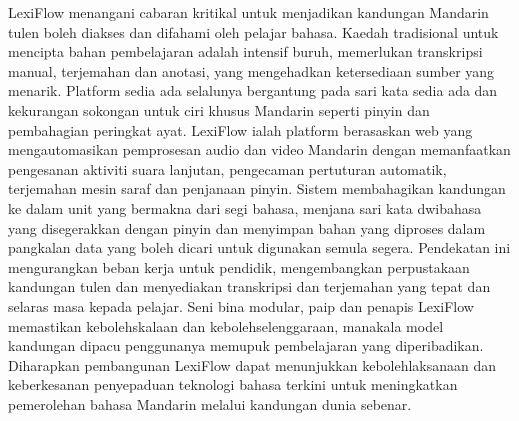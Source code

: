 \documentclass[oneside]{utmthesis}
\begin{document}
\begin{abstract}
    LexiFlow addresses the critical challenge of making authentic Mandarin content accessible and comprehensible for language learners. Traditional methods for creating learning materials are labor-intensive, requiring manual transcription, translation, and annotation, which limits the availability of engaging resources. Existing platforms often depend on pre-existing subtitles and lack support for Mandarin-specific features such as pinyin and sentence-level segmentation. LexiFlow is a web-based platform that automates the processing of Mandarin audio and video by leveraging advanced voice activity detection, automatic speech recognition, neural machine translation, and pinyin generation. The system segments content into linguistically meaningful units, generates synchronized bilingual subtitles with pinyin, and stores processed materials in a searchable database for instant reuse. This approach reduces the workload for educators, expands the library of authentic content, and provides learners with accurate, time-aligned transcriptions and translations. LexiFlow’s modular, pipe-and filter architecture ensures scalability and maintainability, while its user-driven content model fosters personalized learning. It is hoped that the development of LexiFlow can demonstrate the feasibility and effectiveness of integrating state-of-the-art language technologies to enhance Mandarin language acquisition through real-world content.
\end{abstract}

\begin{abstrak}
    LexiFlow menangani cabaran kritikal untuk menjadikan kandungan Mandarin tulen boleh diakses dan difahami oleh pelajar bahasa. Kaedah tradisional untuk mencipta bahan pembelajaran adalah intensif buruh, memerlukan transkripsi manual, terjemahan dan anotasi, yang mengehadkan ketersediaan sumber yang menarik. Platform sedia ada selalunya bergantung pada sari kata sedia ada dan kekurangan sokongan untuk ciri khusus Mandarin seperti pinyin dan pembahagian peringkat ayat. LexiFlow ialah platform berasaskan web yang mengautomasikan pemprosesan audio dan video Mandarin dengan memanfaatkan pengesanan aktiviti suara lanjutan, pengecaman pertuturan automatik, terjemahan mesin saraf dan penjanaan pinyin. Sistem membahagikan kandungan ke dalam unit yang bermakna dari segi bahasa, menjana sari kata dwibahasa yang disegerakkan dengan pinyin dan menyimpan bahan yang diproses dalam pangkalan data yang boleh dicari untuk digunakan semula segera. Pendekatan ini mengurangkan beban kerja untuk pendidik, mengembangkan perpustakaan kandungan tulen dan menyediakan transkripsi dan terjemahan yang tepat dan selaras masa kepada pelajar. Seni bina modular, paip dan penapis LexiFlow memastikan kebolehskalaan dan kebolehselenggaraan, manakala model kandungan dipacu penggunanya memupuk pembelajaran yang diperibadikan. Diharapkan pembangunan LexiFlow dapat menunjukkan kebolehlaksanaan dan keberkesanan penyepaduan teknologi bahasa terkini untuk meningkatkan pemerolehan bahasa Mandarin melalui kandungan dunia sebenar.
\end{abstrak}
\end{document}
